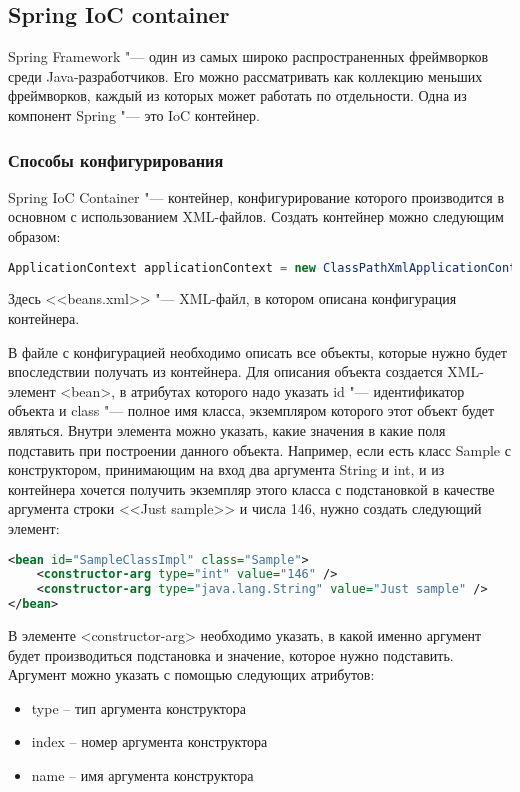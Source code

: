 \subsection{Spring IoC container}

Spring Framework "--- один из самых широко распространенных фреймворков среди Java-разработчиков. Его можно рассматривать как коллекцию меньших фреймворков, каждый из которых
может работать по отдельности. Одна из компонент Spring "--- это IoC контейнер.

\subsubsection{Способы конфигурирования}

Spring IoC Container "--- контейнер, конфигурирование которого производится в основном с использованием XML-файлов. Создать контейнер можно следующим образом:

\begin{lstlisting}[language=Java,caption={Создание контейнера}]
ApplicationContext applicationContext = new ClassPathXmlApplicationContext(new String[]{"beans.xml"});
\end{lstlisting}

Здесь <<beans.xml>> "--- XML-файл, в котором описана конфигурация контейнера.

В файле с конфигурацией необходимо описать все объекты, которые нужно будет впоследствии получать из контейнера. Для описания объекта создается XML-элемент <bean>, 
в атрибутах которого надо указать id "--- идентификатор объекта и class "--- полное имя класса, экземпляром которого этот объект будет являться. Внутри элемента можно указать, 
какие значения в какие поля подставить при построении данного объекта. Например, если есть класс Sample с конструктором, принимающим на вход два аргумента String и int, 
и из контейнера хочется получить экземпляр этого класса с подстановкой в качестве аргумента строки <<Just sample>> и числа 146, нужно создать следующий элемент:

\begin{lstlisting}[language=XML,caption={Пример конфигурации объекта}]
<bean id="SampleClassImpl" class="Sample">
	<constructor-arg type="int" value="146" />
	<constructor-arg type="java.lang.String" value="Just sample" />
</bean>
\end{lstlisting}

В элементе <constructor-arg> необходимо указать, в какой именно аргумент будет производиться подстановка и значение, которое нужно подставить.
Аргумент можно указать с помощью следующих атрибутов:
\begin{itemize}
	\item type – тип аргумента конструктора
	\item index – номер аргумента конструктора
	\item name – имя аргумента конструктора
\end{itemize}

